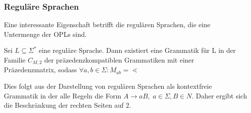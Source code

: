 \subsubsection{Reguläre Sprachen}
Eine interessante Eigenschaft betrifft die regulären Sprachen, die eine Untermenge der OPLs sind.\cite{op_vpl_property}
\begin{lemma}
Sei $L\subseteq\Sigma^*$ eine reguläre Sprache. Dann existiert eine Grammatik für L in der Familie $C_{M,2}$ der präzedenzkompatiblen Grammatiken mit einer Präzedenzmatrix, sodass $\forall a,b\in \Sigma: M_{ab}=\lessdot$
\end{lemma}
Dies folgt aus der Darstellung von regulären Sprachen als kontextfreie Grammatik in der alle Regeln die Form $A\rightarrow aB, \; a \in \Sigma, B \in N$. Daher ergibt sich die Beschränkung der rechten Seiten auf 2.

